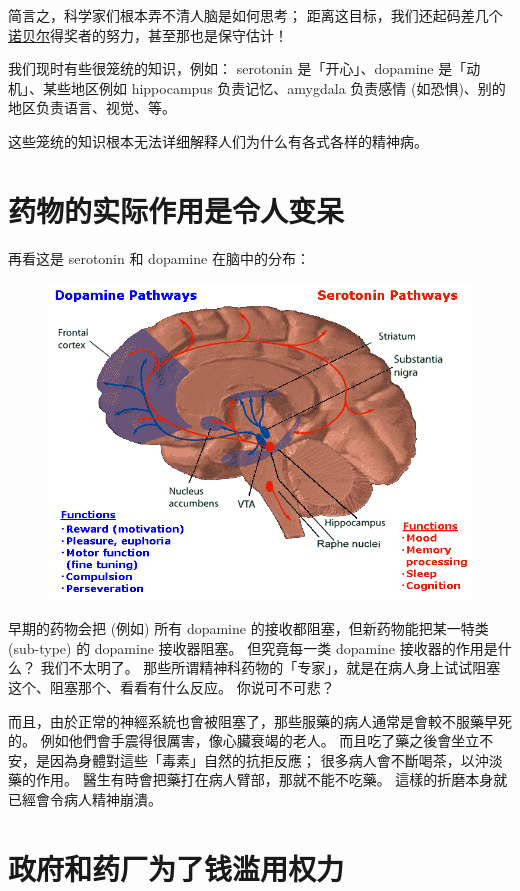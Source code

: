 \documentclass[12pt]{report}
\begin{document}
{简言之，科学家们根本弄不清人脑是如何思考； 距离这目标，我们还起码差几个\uline{诺贝尔}得奖者的努力，甚至那也是保守估计！

我们现时有些很笼统的知识，例如： serotonin 是「开心」、dopamine 是「动机」、某些地区例如 hippocampus 负责记忆、amygdala 负责感情 (如恐惧)、别的地区负责语言、视觉、等。

这些笼统的知识根本无法详细解释人们为什么有各式各样的精神病。

\section{药物的实际作用是令人变呆}

再看这是 serotonin 和 dopamine 在脑中的分布：
\begin{figure}[H]
\centering
\includegraphics[scale=0.4]{dopamine_serotonin.png}
\end{figure}

早期的药物会把 (例如) 所有 dopamine 的接收都阻塞，但新药物能把某一特类 (sub-type) 的 dopamine 接收器阻塞。 但究竟每一类 dopamine 接收器的作用是什么？ 我们不太明了。 那些所谓精神科药物的「专家」，就是在病人身上试试阻塞这个、阻塞那个、看看有什么反应。 你说可不可悲？

而且，由於正常的神經系統也會被阻塞了，那些服藥的病人通常是會較不服藥早死的。 例如他們會手震得很厲害，像心臟衰竭的老人。 而且吃了藥之後會坐立不安，是因為身體對這些「毒素」自然的抗拒反應； 很多病人會不斷喝茶，以沖淡藥的作用。 醫生有時會把藥打在病人臂部，那就不能不吃藥。 這樣的折磨本身就已經會令病人精神崩潰。

\section{政府和药厂为了钱滥用权力}

}
\end{document}
